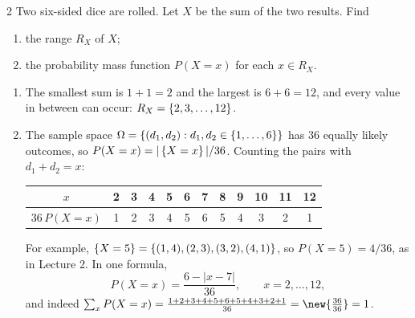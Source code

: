 \begin{homework}{2}
Two six-sided dice are rolled. Let $X$ be the sum of the two results. Find
\begin{enumerate}[label=(\roman*)]
\item the range $R_X$ of $X$;
\item the probability mass function $P(X = x)$ for each $x \in R_X$.
\end{enumerate}

\soln
\begin{enumerate}[label=(\roman*)]
\item The smallest sum is $1 + 1 = 2$ and the largest is $6 + 6 = 12$, and every value in between can occur: $R_X = \left\{2, 3, \dots, 12\right\}$.
\item The sample space $\Omega = \left\{(d_1, d_2) : d_1, d_2 \in \left\{1, \dots, 6\right\}\right\}$ has $36$ equally likely outcomes, so $P(X = x) = |\left\{X = x\right\}|/36$. Counting the pairs with $d_1 + d_2 = x$:
\begin{center}
\begin{tabular}{c|ccccccccccc}
$x$ & 2 & 3 & 4 & 5 & 6 & 7 & 8 & 9 & 10 & 11 & 12\\ \hline
$36\,P(X = x)$ & 1 & 2 & 3 & 4 & 5 & 6 & 5 & 4 & 3 & 2 & 1
\end{tabular}
\end{center}
For example, $\left\{X = 5\right\} = \left\{(1,4), (2,3), (3,2), (4,1)\right\}$, so $P(X = 5) = 4/36$, as in Lecture 2. In one formula,
\[
P(X = x) = \frac{6 - |x - 7|}{36}, \qquad x = 2, \dots, 12,
\]
and indeed $\sum_{x} P(X = x) = \frac{1 + 2 + 3 + 4 + 5 + 6 + 5 + 4 + 3 + 2 + 1}{36} = \new{\frac{36}{36}} = 1$.
\end{enumerate}
\end{homework}

